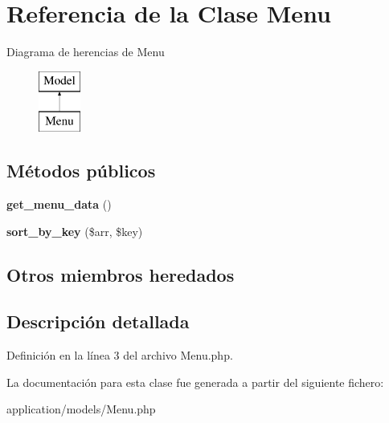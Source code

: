 \hypertarget{class_menu}{}\section{Referencia de la Clase Menu}
\label{class_menu}
Diagrama de herencias de Menu\begin{figure}[H]
\begin{center}
\leavevmode
\includegraphics[height=2.000000cm]{class_menu}
\end{center}
\end{figure}
\subsection*{Métodos públicos}
\begin{DoxyCompactItemize}
\item 
\mbox{\label{class_menu_a363a0af4e2add69b9f35c414f492c82d}} 
{\bfseries get\+\_\+menu\+\_\+data} ()
\item 
\mbox{\label{class_menu_afa4b84bb862d006f3f7a519fa2c8243e}} 
{\bfseries sort\+\_\+by\+\_\+key} (\$arr, \$key)
\end{DoxyCompactItemize}
\subsection*{Otros miembros heredados}


\subsection{Descripción detallada}


Definición en la línea 3 del archivo Menu.\+php.



La documentación para esta clase fue generada a partir del siguiente fichero\+:\begin{DoxyCompactItemize}
\item 
application/models/Menu.\+php\end{DoxyCompactItemize}
